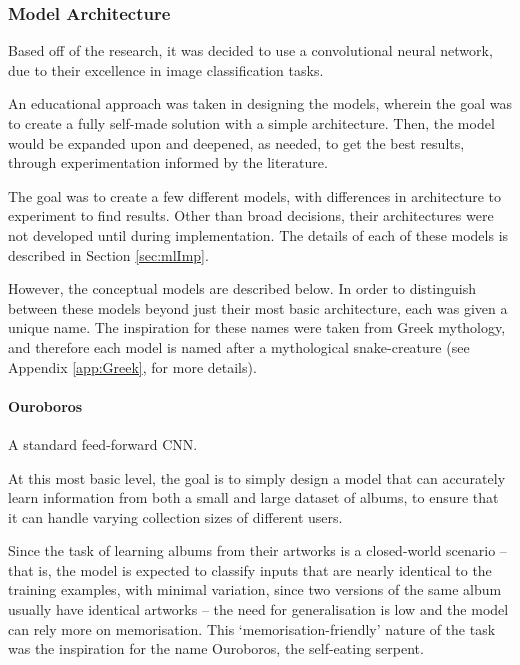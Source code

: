             \subsubsection{Model Architecture}
    
                Based off of the research, it was decided to use a convolutional neural network, due to their excellence in image classification tasks.
    
                An educational approach was taken in designing the models, wherein the goal was to create a fully self-made solution with a simple architecture. Then, the model would be expanded upon and deepened, as needed, to get the best results, through experimentation informed by the literature.
    
                The goal was to create a few different models, with differences in architecture to experiment to find results. Other than broad decisions, their architectures were not developed until during implementation. The details of each of these models is described in Section \ref{sec:mlImp}.
    
                However, the conceptual models are described below. In order to distinguish between these models beyond just their most basic architecture, each was given a unique name. The inspiration for these names were taken from Greek mythology, and therefore each model is named after a mythological snake-creature (see Appendix \ref{app:Greek}, for more details).
    
                \paragraph{Ouroboros} A standard feed-forward CNN.
    
                At this most basic level, the goal is to simply design a model that can accurately learn information from both a small and large dataset of albums, to ensure that it can handle varying collection sizes of different users.
    
                Since the task of learning albums from their artworks is a closed-world scenario -- that is, the model is expected to classify inputs that are nearly identical to the training examples, with minimal variation, since two versions of the same album usually have identical artworks -- the need for generalisation is low and the model can rely more on memorisation. This `memorisation-friendly' nature of the task was the inspiration for the name Ouroboros, the self-eating serpent.
    
